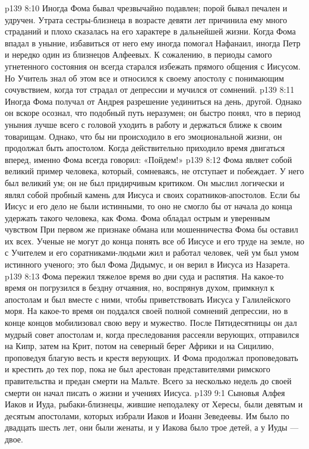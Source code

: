 \vs p139 8:10 \pc Иногда Фома бывал чрезвычайно подавлен; порой бывал печален и удручен. Утрата сестры\hyp{}близнеца в возрасте девяти лет причинила ему много страданий и плохо сказалась на его характере в дальнейшей жизни. Когда Фома впадал в уныние, избавиться от него ему иногда помогал Нафанаил, иногда Петр и нередко один из близнецов Алфеевых. К сожалению, в периоды самого угнетенного состояния он всегда старался избежать прямого общения с Иисусом. Но Учитель знал об этом все и относился к своему апостолу с понимающим сочувствием, когда тот страдал от депрессии и мучился от сомнений.
\vs p139 8:11 Иногда Фома получал от Андрея разрешение уединиться на день, другой. Однако он вскоре осознал, что подобный путь неразумен; он быстро понял, что в период уныния лучше всего с головой уходить в работу и держаться ближе к своим товарищам. Однако, что бы ни происходило в его эмоциональной жизни, он продолжал быть апостолом. Когда действительно приходило время двигаться вперед, именно Фома всегда говорил: «Пойдем!»
\vs p139 8:12 Фома являет собой великий пример человека, который, сомневаясь, не отступает и побеждает. У него был великий ум; он не был придирчивым критиком. Он мыслил логически и являл собой пробный камень для Иисуса и своих соратников\hyp{}апостолов. Если бы Иисус и его дело не были истинными, то оно не смогло бы от начала до конца удержать такого человека, как Фома. Фома обладал острым и уверенным чувством  При первом же признаке обмана или мошенничества Фома бы оставил их всех. Ученые не могут до конца понять все об Иисусе и его труде на земле, но с Учителем и его соратниками\hyp{}людьми жил и работал человек, чей ум был умом истинного ученого; это был Фома Дидымус, и он верил в Иисуса из Назарета.
\vs p139 8:13 \pc Фома пережил тяжелое время во дни суда и распятия. На какое\hyp{}то время он погрузился в бездну отчаяния, но, воспрянув духом, примкнул к апостолам и был вместе с ними, чтобы приветствовать Иисуса у Галилейского моря. На какое\hyp{}то время он поддался своей полной сомнений депрессии, но в конце концов мобилизовал свою веру и мужество. После Пятидесятницы он дал мудрый совет апостолам и, когда преследования рассеяли верующих, отправился на Кипр, затем на Крит, потом на северный берег Африки и на Сицилию, проповедуя благую весть и крестя верующих. И Фома продолжал проповедовать и крестить до тех пор, пока не был арестован представителями римского правительства и предан смерти на Мальте. Всего за несколько недель до своей смерти он начал писать о жизни и учениях Иисуса.
\vs p139 9:1 Сыновья Алфея Иаков и Иуда, рыбаки\hyp{}близнецы, жившие неподалеку от Хересы, были девятым и десятым апостолами, которых избрали Иаков и Иоанн Зеведеевы. Им было по двадцать шесть лет, они были женаты, и у Иакова было трое детей, а у Иуды --- двое.
